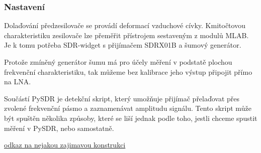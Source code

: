 \documentclass[12pt,a4paper,oneside]{article}
\begin{document}
\newpage



\subsubsection{Nastavení}

Dolaďování předzesilovače se provádí deformací vzduchové cívky. Kmitočtovou charakteristiku zesilovače lze přeměřit přístrojem sestaveným z modulů MLAB. Je k tomu potřeba SDR-widget s přijímačem SDRX01B a šumový generátor.

Protože zmíněný generátor šumu má pro účely měření v podstatě plochou frekvenční charakteristiku, tak můžeme bez kalibrace jeho výstup připojit přímo na LNA.

Součástí PySDR je detekční skript, který umožňuje přijímač přelaďovat přes zvolené frekvenční pásmo a zaznamenávat amplitudu signálu. Tento skript může být spuštěn několika způsoby, které se liší jednak podle toho, jestli chceme spustit měření v PySDR, nebo samostatně.


\begin{thebibliography}{99}
\href{http:// odkaz na nejakou zajimavou konstrukci}{odkaz na nejakou zajimavou konstrukci}

\end{thebibliography}
\end{document}
